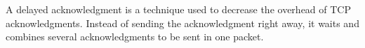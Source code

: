A delayed acknowledgment is a technique used to decrease the overhead of TCP acknowledgments.
Instead of sending the acknowledgment right away, it waits and combines several acknowledgments to be sent in one packet.